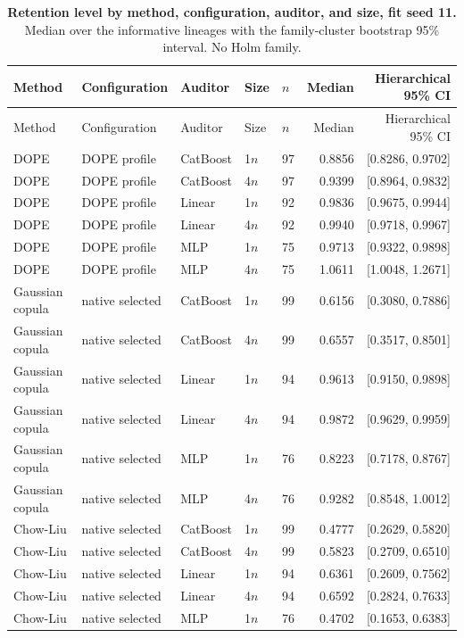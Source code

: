 \begin{longtable}{lllllrr}
\caption{\textbf{Retention level by method, configuration, auditor, and size, fit seed 11.} Median over the informative lineages with the family-cluster bootstrap 95\% interval. No Holm family.}\label{tab:review-size}\\
\toprule
Method & Configuration & Auditor & Size & $n$ & Median & Hierarchical 95\% CI \\
\midrule
\endfirsthead
\toprule
Method & Configuration & Auditor & Size & $n$ & Median & Hierarchical 95\% CI \\
\midrule
\endhead
DOPE & DOPE profile & CatBoost & 1$n$ & 97 & 0.8856 & [0.8286, 0.9702] \\
DOPE & DOPE profile & CatBoost & 4$n$ & 97 & 0.9399 & [0.8964, 0.9832] \\
DOPE & DOPE profile & Linear & 1$n$ & 92 & 0.9836 & [0.9675, 0.9944] \\
DOPE & DOPE profile & Linear & 4$n$ & 92 & 0.9940 & [0.9718, 0.9967] \\
DOPE & DOPE profile & MLP & 1$n$ & 75 & 0.9713 & [0.9322, 0.9898] \\
DOPE & DOPE profile & MLP & 4$n$ & 75 & 1.0611 & [1.0048, 1.2671] \\
Gaussian copula & native selected & CatBoost & 1$n$ & 99 & 0.6156 & [0.3080, 0.7886] \\
Gaussian copula & native selected & CatBoost & 4$n$ & 99 & 0.6557 & [0.3517, 0.8501] \\
Gaussian copula & native selected & Linear & 1$n$ & 94 & 0.9613 & [0.9150, 0.9898] \\
Gaussian copula & native selected & Linear & 4$n$ & 94 & 0.9872 & [0.9629, 0.9959] \\
Gaussian copula & native selected & MLP & 1$n$ & 76 & 0.8223 & [0.7178, 0.8767] \\
Gaussian copula & native selected & MLP & 4$n$ & 76 & 0.9282 & [0.8548, 1.0012] \\
Chow-Liu & native selected & CatBoost & 1$n$ & 99 & 0.4777 & [0.2629, 0.5820] \\
Chow-Liu & native selected & CatBoost & 4$n$ & 99 & 0.5823 & [0.2709, 0.6510] \\
Chow-Liu & native selected & Linear & 1$n$ & 94 & 0.6361 & [0.2609, 0.7562] \\
Chow-Liu & native selected & Linear & 4$n$ & 94 & 0.6592 & [0.2824, 0.7633] \\
Chow-Liu & native selected & MLP & 1$n$ & 76 & 0.4702 & [0.1653, 0.6383] \\

\end{longtable}
